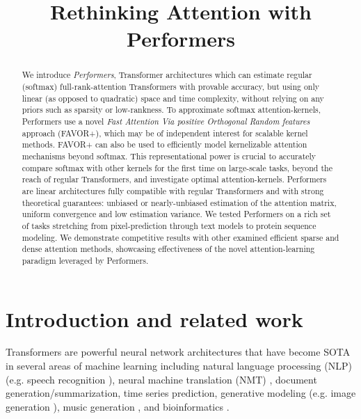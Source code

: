 \title{Rethinking Attention with Performers}

\begin{abstract}
We introduce \textit{Performers}, Transformer architectures which can estimate regular (softmax) full-rank-attention Transformers with provable accuracy, but using only linear (as opposed to quadratic) space and time complexity, without relying on any priors such as sparsity or low-rankness. To approximate softmax attention-kernels, Performers use a novel \textit{Fast Attention Via positive Orthogonal Random features} approach (FAVOR+), which may be of independent interest for scalable kernel methods. FAVOR+ can also be used to efficiently model kernelizable attention mechanisms beyond softmax. This representational power is crucial to accurately compare softmax with other kernels for the first time on large-scale tasks, beyond the reach of regular Transformers, and investigate optimal attention-kernels. Performers are linear architectures fully compatible with regular Transformers and with strong theoretical guarantees: unbiased or nearly-unbiased estimation of the attention matrix, uniform convergence and low  estimation variance. We tested Performers on a rich set of tasks stretching from pixel-prediction through text models to protein sequence modeling. We demonstrate competitive results with other examined efficient sparse and dense attention methods, showcasing effectiveness of the novel attention-learning paradigm leveraged by Performers.
\end{abstract}

\section{Introduction and related work}
\label{sec:intro_related_work}

Transformers \citep{transformer, universal_t} are powerful neural network architectures that have become SOTA in several areas of machine learning including natural language processing (NLP) (e.g. speech recognition \citep{luo}), neural machine translation (NMT) \citep{nmt}, document generation/summarization, time series prediction, generative modeling (e.g. image generation \citep{parmar}), music generation \citep{simon}, and bioinformatics \citep{rives, progen, ingraham2019generative, elnaggar2019end, du2020energy}. 

